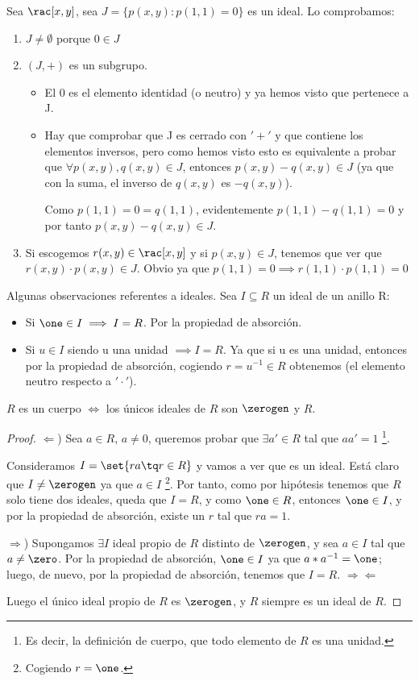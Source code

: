\begin{example} Sea $\rac[x,y]$, sea $J=\{p(x,y): p(1,1)=0\}$ es un ideal. Lo comprobamos:
\begin{enumerate}
	\item $J \neq \emptyset$ porque $0 \in J$
	\item $(J,+)$ es un subgrupo.
	\begin{itemize}
		\item El 0 es el elemento identidad (o neutro) y ya hemos visto que pertenece a J.
		\item Hay que comprobar que J es cerrado con $'+'$ y que contiene los elementos inversos, pero como hemos visto esto es equivalente a probar que $\forall p(x,y), q(x,y) \in J$, entonces $p(x,y)-q(x,y) \in J$ (ya que con la suma, el inverso de $q(x,y)$ es $-q(x,y)$).

		Como $p(1,1)=0=q(1,1)$, evidentemente $p(1,1)-q(1,1)=0$ y por tanto $p(x,y)-q(x,y) \in J$.
	\end{itemize}
	\item Si escogemos $r(x,y) \in \rac[x,y]$ y si $p(x,y) \in J$, tenemos que ver que $r(x,y)\cdot p(x,y) \in J$. Obvio ya que $p(1,1)=0 \implies r(1,1)\cdot p(1,1) = 0$
\end{enumerate}
\end{example}

Algunas observaciones referentes a ideales. Sea $I \subseteq R$ un ideal de un anillo R:
\begin{itemize}
	\item Si $\one \in I \implies I=R$. Por la propiedad de absorción.
	\item Si $u\in I$ siendo u una unidad $\implies I=R$. Ya que si u es una unidad, entonces por la propiedad de absorción, cogiendo $r=u^{-1} \in R$ obtenemos \one (el elemento neutro respecto a $'\cdot'$).
\end{itemize}
\begin{prop}
	$R$ es un cuerpo $\iff$ los únicos ideales de $R$ son $\zerogen$ y $R$.
\end{prop}
\begin{proof}

	$\Leftarrow$) Sea $a \in R$, $a \neq 0$, queremos probar que $\exists a' \in R$ tal que $aa' = 1$ \footnote{Es decir, la definición de cuerpo, que todo elemento de $R$ es una unidad.}.

	Consideramos $I=\set{ra \tq r \in R}$ y vamos a ver que es un ideal. Está claro que $I \neq \zerogen$ ya que $a \in I$ \footnote{Cogiendo $r = \one$.}. Por tanto, como por hipótesis tenemos que $R$ solo tiene dos ideales, queda que $I=R$, y como $\one \in R$, entonces $\one \in I$, y por la propiedad de absorción, existe un $r$ tal que $ra=1$.

	$\Rightarrow$) Supongamos $\exists I$ ideal propio de $R$ distinto de $\zerogen$, y sea $a \in I$ tal que $a \neq \zero$. Por la propiedad de absorción, $\one \in I$ ya que $a*a^{-1} = \one$; luego, de nuevo, por la propiedad de absorción, tenemos que $I = R$. $\Rightarrow\Leftarrow$

	Luego el único ideal propio de $R$ es $\zerogen$, y $R$ siempre es un ideal de $R$.
\end{proof}

